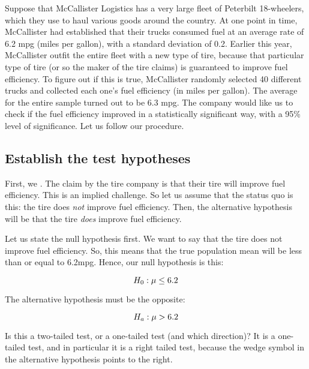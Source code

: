 \documentclass[../../../main.tex]{subfiles}
\begin{document}
Suppose that McCallister Logistics has a very large fleet of Peterbilt 18-wheelers, which they use to haul various goods around the country. At one point in time, McCallister had established that their trucks consumed fuel at an average rate of 6.2 mpg (miles per gallon), with a standard deviation of 0.2. Earlier this year, McCallister outfit the entire fleet with a new type of tire, because that particular type of tire (or so the maker of the tire claims) is guaranteed to improve fuel efficiency. To figure out if this is true, McCallister randomly selected 40 different trucks and collected each one's fuel efficiency (in miles per gallon). The average for the entire sample turned out to be 6.3 mpg. The company would like us to check if the fuel efficiency improved in a statistically significant way, with a 95\% level of significance. Let us follow our procedure.


\subsection{Establish the test hypotheses}

First, we . The claim by the tire company is that their tire will improve fuel efficiency. This is an implied challenge. So let us assume that the status quo is this: the tire does \emph{not} improve fuel efficiency. Then, the alternative hypothesis will be that the tire \emph{does} improve fuel efficiency.

Let us state the null hypothesis first. We want to say that the tire does not improve fuel efficiency. So, this means that the true population mean will be less than or equal to 6.2mpg. Hence, our null hypothesis is this:

\begin{equation*}
  \NullHyp/: \populationmean \leq 6.2
\end{equation*}

\noindent
The alternative hypothesis must be the opposite:

\begin{equation*}
  \AltHyp/: \populationmean > 6.2
\end{equation*}

\noindent
Is this a two-tailed test, or a one-tailed test (and which direction)? It is a one-tailed test, and in particular it is a right tailed test, because the wedge symbol in the alternative hypothesis points to the right.
\end{document}
